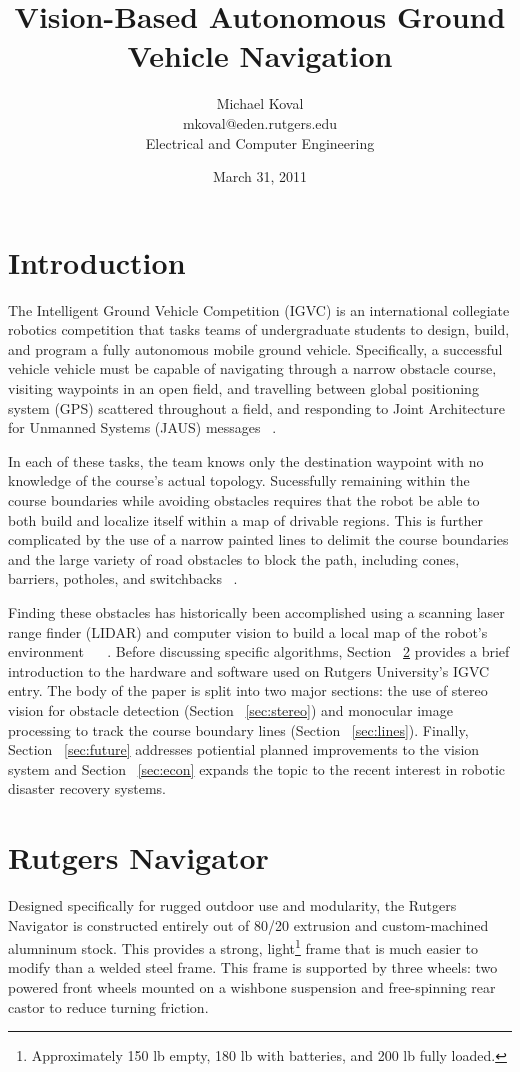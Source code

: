 \documentclass[11pt,twocolumn]{article}
\title{Vision-Based Autonomous Ground Vehicle Navigation}
\date{March 31, 2011}
\author{
	Michael Koval \\
	mkoval@eden.rutgers.edu \\
	Electrical and Computer Engineering
}
\begin{document}
\maketitle

\section{Introduction}
\label{sec:intro}
The Intelligent Ground Vehicle Competition (IGVC) is an international
collegiate robotics competition that tasks teams of undergraduate students to
design, build, and program a fully autonomous mobile ground vehicle.
Specifically, a successful vehicle vehicle must be capable of navigating
through a narrow obstacle course, visiting waypoints in an open field, and
travelling between global positioning system (GPS) scattered throughout a
field, and responding to Joint Architecture for Unmanned Systems (JAUS)
messages ~\cite{igvc11}.

In each of these tasks, the team knows only the destination waypoint with no
knowledge of the course's actual topology. Sucessfully remaining within the
course boundaries while avoiding obstacles requires that the robot be able to
both build and localize itself within a map of drivable regions. This is
further complicated by the use of a narrow painted lines to delimit the course
boundaries and the large variety of road obstacles to block the path, including
cones, barriers, potholes, and switchbacks ~\cite{igvc11}.

Finding these obstacles has historically been accomplished using a scanning
laser range finder (LIDAR) and computer vision to build a local map of the
robot's environment ~\cite{princeton08} ~\cite{delaware08}. Before discussing
specific algorithms, Section ~\ref{sec:robot} provides a brief introduction to
the hardware and software used on Rutgers University's IGVC entry. The body of
the paper is split into two major sections: the use of stereo vision for
obstacle detection (Section ~\ref{sec:stereo}) and monocular image processing
to track the course boundary lines (Section ~\ref{sec:lines}). Finally, Section
~\ref{sec:future} addresses potiential planned improvements to the vision
system and Section ~\ref{sec:econ} expands the topic to the recent interest
in robotic disaster recovery systems.

\section{Rutgers Navigator}
\label{sec:robot}
Designed specifically for rugged outdoor use and modularity, the Rutgers
Navigator is constructed entirely out of 80/20 extrusion and custom-machined
alumninum stock. This provides a strong, light\footnote{Approximately 150 lb
empty, 180 lb with batteries, and 200 lb fully loaded.} frame that is much
easier to modify than a welded steel frame. This frame is supported by three
wheels: two powered front wheels mounted on a wishbone suspension and
free-spinning rear castor to reduce turning friction.
\end{document}
